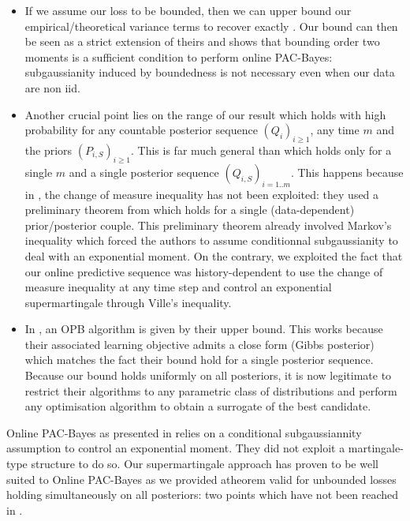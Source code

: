 \begin{itemize}
  \item If we assume our loss to be bounded, then we can upper bound our empirical/theoretical variance terms to recover exactly \citet[][Theorem 2.3]{haddouche2022online}. Our bound can then be seen as a strict extension of theirs and shows that bounding order two moments is a sufficient condition to perform online PAC-Bayes: subgaussianity induced by boundedness is not necessary even when our data are non iid.
  \item Another crucial point lies on the range of our result which holds with high probability for any countable posterior sequence $(Q_i)_{i\geq 1}$, any time $m$ and the priors $(P_{i,S})_{i\geq 1}$.
  This is far much general than \citet[][Theorem 2.3]{haddouche2022online} which holds only for a single $m$ and a single posterior sequence $(Q_{i,S})_{i=1..m}$. This happens because in \citet{haddouche2022online}, the change of measure inequality has not been exploited: they used a preliminary theorem from \citet{rivasplata2020pac} which holds for a single (data-dependent) prior/posterior couple. This preliminary theorem already involved Markov's inequality which forced the authors to assume conditionnal subgaussianity to deal with an exponential moment. On the contrary, we exploited the fact that our online predictive sequence was history-dependent to use the change of measure inequality at any time step and control an exponential supermartingale through Ville's inequality.
  \item In \citet[Eq. 1]{haddouche2022online}, an OPB algorithm is given by their upper bound. This works because their associated learning objective admits a close form (Gibbs posterior) which matches the fact their bound hold for a single posterior sequence. Because our bound holds uniformly on all posteriors, it is now legitimate to restrict their algorithms to any parametric class of distributions and perform any optimisation algorithm to obtain a surrogate of the best candidate.
\end{itemize}

 Online PAC-Bayes as presented in \citet{haddouche2022online} relies on a conditional subgaussiannity assumption to control an exponential moment. They did not exploit a martingale-type structure to do so. Our supermartingale approach has proven to be well suited to Online PAC-Bayes as we provided atheorem valid for unbounded losses holding simultaneously on all posteriors: two points which have not been reached in \citet{haddouche2022online}.

